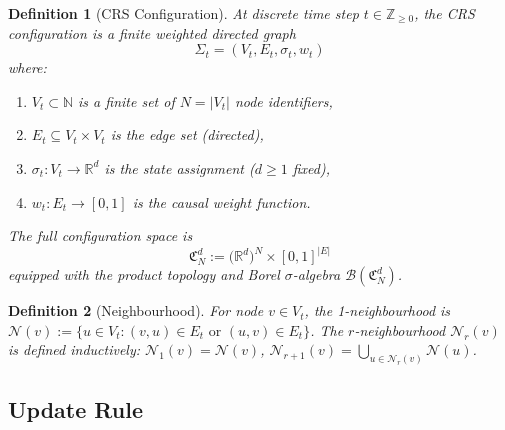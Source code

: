 \documentclass[11pt,a4paper]{article}
\newtheorem{definition}{Definition}[section]
\theoremstyle{remark}
\begin{document}
\begin{definition}[CRS Configuration]
\label{def:crs_config}
At discrete time step $t \in \mathbb{Z}_{\geq 0}$, the CRS
\emph{configuration} is a finite weighted directed graph
\[
  \Sigma_t = (V_t, E_t, \sigma_t, w_t)
\]
where:
\begin{enumerate}[label=(\roman*)]
  \item $V_t \subset \mathbb{N}$ is a finite set of $N = |V_t|$ node
    identifiers,
  \item $E_t \subseteq V_t \times V_t$ is the edge set (directed),
  \item $\sigma_t: V_t \to \mathbb{R}^d$ is the \emph{state assignment}
    ($d \geq 1$ fixed),
  \item $w_t: E_t \to [0,1]$ is the \emph{causal weight function}.
\end{enumerate}
The \emph{full configuration space} is
\begin{equation}
  \mathfrak{C}_N^d :=
    \bigl(\mathbb{R}^d\bigr)^N \times [0,1]^{|E|}
\end{equation}
equipped with the product topology and Borel $\sigma$-algebra
$\mathcal{B}(\mathfrak{C}_N^d)$.
\end{definition}

\begin{definition}[Neighbourhood]
\label{def:crs_nbhd}
For node $v \in V_t$, the \emph{1-neighbourhood} is
$\mathcal{N}(v) := \{u \in V_t : (v,u) \in E_t \text{ or }
(u,v) \in E_t\}$.
The \emph{$r$-neighbourhood} $\mathcal{N}_r(v)$ is defined inductively:
$\mathcal{N}_1(v) = \mathcal{N}(v)$,
$\mathcal{N}_{r+1}(v) = \bigcup_{u \in \mathcal{N}_r(v)} \mathcal{N}(u)$.
\end{definition}

\subsection{Update Rule}
\end{document}
